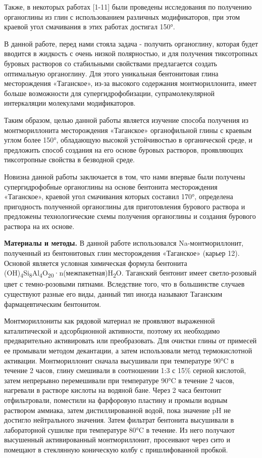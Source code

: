 Также, в некоторых работах {[}1-11{]} были проведены исследования по
получению органоглины из глин с использованием различных модификаторов,
при этом краевой угол смачивания в этих работах достигал 150°.

В данной работе, перед нами стояла задача - получить органоглину,
которая будет вводится в жидкость с очень низкой полярностью, и для
получения тиксотропных буровых растворов со стабильными свойствами
предлагается создать оптимальную органоглину. Для этого уникальная
бентонитовая глина месторождения «Таганское», из-за высокого содержания
монтмориллонита, имеет больше возможности для супергидрофобизации,
супрамолекулярной интеркаляции молекулами модификаторов.

Таким образом, целью данной работы является изучение способа получения
из монтмориллонита месторождения «Таганское» органофильной глины с
краевым углом более 150°, обладающую высокой устойчивостью в
органической среде, и предложить способ создания на его основе буровых
растворов, проявляющих тиксотропные свойства в безводной среде.

Новизна данной работы заключается в том, что нами впервые были получены
супергидрофобные органоглины на основе бентонита месторождения
«Таганское», краевой угол смачивания которых составил 170°, определена
пригодность полученной органоглины для приготовления бурового раствора и
предложены технологические схемы получения органоглины и создания
бурового раствора на их основе.

\textbf{Материалы и методы.} В данной работе использовался
Na-монтмориллонит, полученный из бентонитовых глин месторождения
«Таганское» (карьер 12). Основой является условная химическая формула
бентонита
(OH)\textsubscript{4}Si\textsubscript{8}Al\textsubscript{4}O\textsubscript{20}·n(межпакетная)H\textsubscript{2}O.
Таганский бентонит имеет светло-розовый цвет с темно-розовыми пятнами.
Вследствие того, что в большинстве случаев существуют разные его виды,
данный тип иногда называют Таганским фармацевтическим бентонитом.

Монтмориллониты как рядовой материал не проявляют выраженной
каталитической и адсорбционной активности, поэтому их необходимо
предварительно активировать или преобразовать. Для очистки глины от
примесей ее промывали методом декантации, а затем использовали метод
термокислотной активации. Монтмориллонит сначала высушивали при
температуре 90°C в течение 2 часов, глину смешивали в соотношении 1:3 с
15\% серной кислотой, затем непрерывно перемешивали при температуре 90°C
в течение 2 часов, нагревали в растворе кислоты на водяной бане. Через 2
часа бентонит отфильтровали, поместили на фарфоровую пластину и промыли
водным раствором аммиака, затем дистиллированной водой, пока значение pH
не достигло нейтрального значения. Затем фильтрат бентонита высушивали в
лабораторной сушилке при температуре 80°C в течение. Из него получают
высушенный активированный монтмориллонит, просеивают через сито и
помещают в стеклянную коническую колбу с пришлифованной пробкой.


